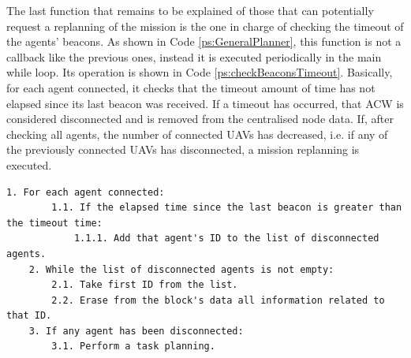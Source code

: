 \documentclass[fontsize=11pt, English=false, Español=true, Myfinal=true, twoside, numbers=noenddot]{scrbook}
\begin{document}
The last function that remains to be explained of those that can potentially request a replanning of the mission is the one in charge of checking the timeout of the agents' beacons. As shown in  Code \ref{ps:GeneralPlanner}, this function is not a callback like the previous ones, instead it is executed periodically in the main while loop. Its operation is shown in Code \ref{ps:checkBeaconsTimeout}. Basically, for each agent connected, it checks that the timeout amount of time has not elapsed since its last beacon was received. If a timeout has occurred, that \gls{ACW} is considered disconnected and is removed from the centralised node data. If, after checking all agents, the number of connected \glspl{UAV} has decreased, i.e. if any of the previously connected \glspl{UAV} has disconnected, a mission replanning is executed.

\begin{lstlisting}[caption={Beacons' timeout check function}, breaklines=true, label=ps:checkBeaconsTimeout]
	1. For each agent connected:
		1.1. If the elapsed time since the last beacon is greater than the timeout time:
			1.1.1. Add that agent's ID to the list of disconnected agents.
	2. While the list of disconnected agents is not empty:
		2.1. Take first ID from the list.
		2.2. Erase from the block's data all information related to that ID.
	3. If any agent has been disconnected:
		3.1. Perform a task planning.
\end{lstlisting}
\end{document}
